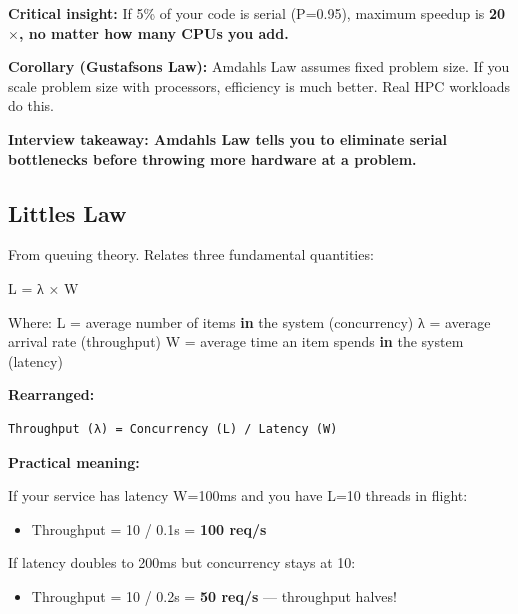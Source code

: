 \documentclass[11pt]{article}
\providecommand{\tightlist}{\setlength{\itemsep}{1pt}\setlength{\parskip}{0pt}}
\newenvironment{Shaded}{\begin{snugshade}}{\end{snugshade}}
\newcommand{\KeywordTok}[1]{\textcolor[rgb]{0.81,0.81,0.76}{\textbf{#1}}}
\newcommand{\NormalTok}[1]{\textcolor[rgb]{0.81,0.81,0.76}{#1}}
\newcommand{\OperatorTok}[1]{\textcolor[rgb]{0.81,0.81,0.76}{#1}}
\begin{document}
\textbf{Critical insight:} If 5\% of your code is serial (P=0.95), maximum speedup is \textbf{20\(\times\), no matter how many CPUs you add.}

\textbf{Corollary (Gustafson\textquotesingle s Law):} Amdahl\textquotesingle s Law assumes fixed problem size. If you scale problem size with processors, efficiency is much better. Real HPC workloads do this.

\textbf{Interview takeaway: Amdahl\textquotesingle s Law tells you to eliminate serial bottlenecks before throwing more hardware at a problem.}

\subsection{Little\textquotesingle s Law}\label{littles-law}

From queuing theory. Relates three fundamental quantities:


\begin{Shaded}
\begin{Highlighting}[]
\NormalTok{L }\OperatorTok{=}\NormalTok{ λ × W}

\NormalTok{Where:}
\NormalTok{  L }\OperatorTok{=}\NormalTok{ average number of items }\KeywordTok{in}\NormalTok{ the system (concurrency)}
\NormalTok{  λ }\OperatorTok{=}\NormalTok{ average arrival rate (throughput)}
\NormalTok{  W }\OperatorTok{=}\NormalTok{ average time an item spends }\KeywordTok{in}\NormalTok{ the system (latency)}
\end{Highlighting}
\end{Shaded}

\textbf{Rearranged:}

\setcodelang{}

\begin{verbatim}
Throughput (λ) = Concurrency (L) / Latency (W)
\end{verbatim}

\textbf{Practical meaning:}

If your service has latency W=100ms and you have L=10 threads in flight:

\begin{itemize}
\tightlist
\item
  Throughput = 10 / 0.1s = \textbf{100 req/s}
\end{itemize}

If latency doubles to 200ms but concurrency stays at 10:

\begin{itemize}
\tightlist
\item
  Throughput = 10 / 0.2s = \textbf{50 req/s} --- throughput halves!
\end{itemize}
\end{document}
